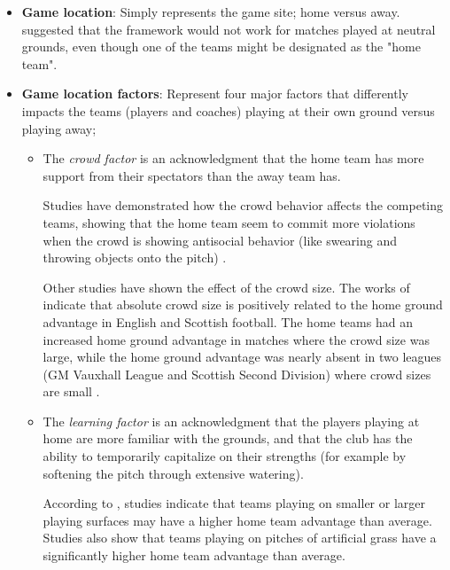 \begin{itemize}
    \item \textbf{Game location}: Simply represents the game site; home versus away. \citet{bib:courneya-carron-1992} suggested that the framework would not work for matches played at neutral grounds, even though one of the teams might be designated as the "home team".
    
    \item \textbf{Game location factors}: Represent four major factors that differently impacts the teams (players and coaches) playing at their own ground versus playing away;
    
    \begin{itemize}
        \item The \textit{crowd factor} is an acknowledgment that the home team has more support from their spectators than the away team has.
        
        Studies have demonstrated how the crowd behavior affects the competing teams, showing that the home team seem to commit more violations when the crowd is showing antisocial behavior (like swearing and throwing objects onto the pitch) \citep{bib:carron-loughead-bray-2005}.
        
        Other studies have shown the effect of the crowd size. The works of \citet{bib:nevill-newell-gale-1996} indicate that absolute crowd size is positively related to the home ground advantage in English and Scottish football. The home teams had an increased home ground advantage in matches where the crowd size was large, while the home ground advantage was nearly absent in two leagues (GM Vauxhall League and Scottish Second Division) where crowd sizes are small \citep{bib:nevill-newell-gale-1996}.
        
        \item The \textit{learning factor} is an acknowledgment that the players playing at home are more familiar with the grounds, and that the club has the ability to temporarily capitalize on their strengths (for example by softening the pitch through extensive watering).
        
        According to \citet{bib:carron-loughead-bray-2005}, studies indicate that teams playing on smaller or larger playing surfaces may have a higher home team advantage than average. Studies also show that teams playing on pitches of artificial grass have a significantly higher home team advantage than average.
        

\end{itemize}
\end{itemize}
